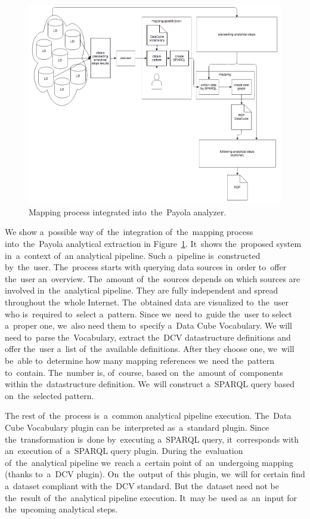\begin{figure}
	\centering
	\includegraphics[width=140mm]{img/payola-mapping.png}
	\caption{Mapping process integrated into~the~Payola analyzer.}
	\label{fig:payola-mapping}
\end{figure}

We show a~possible way of~the~integration of~the~mapping process into~the~Payola analytical extraction
in Figure~\ref{fig:payola-mapping}. It~shows the~proposed system in~a~context of~an
analytical pipeline. Such a~pipeline is~constructed by~the~user. The~process starts with querying data 
sources in~order to~offer the~user an~overview. The~amount of~the~sources depends 
on which sources are involved in~the~analytical pipeline. They are fully independent 
and spread throughout the~whole Internet. The~obtained data are visualized to~the~user who is~required to~select a~pattern. Since we~need to~guide the~user 
to select a~proper one, we~also need them to~specify a~Data Cube Vocabulary. 
We will need to~parse the~Vocabulary, extract the~DCV datastructure definitions 
and offer the~user a~list of~the~available definitions. After they choose one, we~will be~able to~determine how many mapping references we~need the~pattern to~contain. The~number is, of~course, based on~the~amount of~components 
within the~datastructure definition. We~will construct a~SPARQL query based on~the~selected pattern.

The rest of~the~process is~a~common analytical pipeline execution. The~Data Cube 
Vocabulary plugin can be~interpreted as~a~standard plugin. Since the~transformation is~done by~executing a~SPARQL query, it~corresponds with an~execution of~a~SPARQL query plugin. During the~evaluation of~the~analytical pipeline we~reach a~certain point of~an~undergoing mapping (thanks to~a~DCV plugin). On~the~output of~this plugin, we~will for certain find a~dataset compliant with the~DCV standard. But the~dataset need not 
be the~result of~the~analytical pipeline execution. It~may be~used as~an~input 
for the~upcoming analytical steps.

